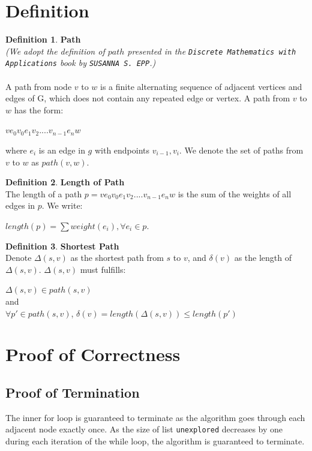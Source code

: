 \documentclass[11pt, oneside]{article}   	%
\newcommand\tab[1][1cm]{\hspace*{#1}}
\theoremstyle{definition}
\newtheorem{definition}{Definition}[section]
\begin{document}
\section{Definition}
\theoremstyle{definition}
\begin{definition}\textbf{Path}\\
\textit{(We adopt the definition of $path$ presented in the \texttt{Discrete Mathematics with Applications} book by \texttt{SUSANNA S. EPP}.)}
\\\\
A path from node $v$ to $w$ is a finite alternating sequence of adjacent vertices and edges of G, which does not contain any repeated edge or vertex. A path from $v$ to $w$ has the form: 
\begin{center}
 $ve_0v_0e_1v_2....v_{n-1}e_nw$ 
\end{center}
where $e_i$ is an edge in $g$ with endpoints $v_{i-1}, v_i$. We denote the set of paths from $v$ to $w$ as $path(v, w)$.
\end{definition}
\tab
\begin{definition}\textbf{Length of Path} \\
The length of a path $p = ve_0v_0e_1v_2....v_{n-1}e_nw$ is the sum of the weights of all edges in $p$. We write: 
\begin{center}
  $length(p) = \sum weight(e_i), \forall e_i \in p$. 
\end{center} 
\end{definition}
\tab
\begin{definition}\textbf{Shortest Path}\\
Denote $\Delta(s, v)$ as the shortest path from $s$ to $v$, and $\delta(v)$ as the length of $\Delta(s, v)$. $\Delta(s, v)$ must fulfills: 
\begin{center}
$\Delta(s, v) \in path(s, v)$ 
\\
and 
\\
$\forall p' \in path(s, v)$, $\delta(v) = length(\Delta(s, v)) \leq length(p')$
\end{center}
\end{definition}

\section{Proof of Correctness}
\subsection{Proof of Termination}
The inner for loop is guaranteed to terminate as the algorithm goes through each adjacent node exactly once. As the size of list \texttt{unexplored} decreases by one during each iteration of the while loop, the algorithm is guaranteed to terminate. 
\end{document}
